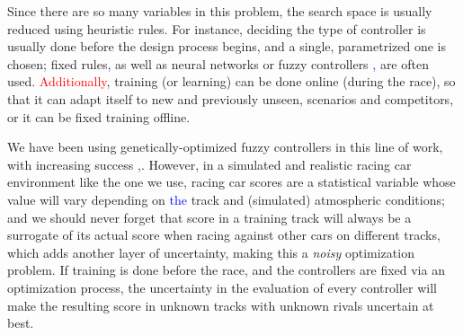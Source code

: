 \documentclass[10pt,journal,compsoc]{IEEEtran}
\begin{document}
Since there are so many variables in this problem, the search space is usually reduced using heuristic rules. For instance, deciding the type of controller is usually done before the design process begins, and a single, parametrized one
is chosen; fixed rules\textcolor{blue}{,} as well as neural networks \cite{KIM201287} or fuzzy controllers \cite{PerezEvolvingFuzzy09}\textcolor{blue}{,} are often used. \textcolor{red}{
Additionally}, training (or learning) \cite{Loiacono:2012:LEA:2212908.2212953} can be done online (during the
race), so that it can adapt itself to new and previously unseen,
scenarios and competitors, or it can be fixed training offline. 

We have been using genetically-optimized fuzzy controllers in this line of work, with increasing success \cite{salem_evo17},\cite{salem_evo18}.
However, in a simulated and realistic racing car environment like the one we use, racing car scores are a
    statistical variable whose value will vary depending on \textcolor{blue}{the} track and
    (simulated) atmospheric conditions; and we should never forget
    that score in a training track will always be a surrogate of its
    actual score when racing against other cars on different tracks,
    which adds another layer of uncertainty, making this a {\em noisy} optimization problem.
If training is done before the
    race, and the controllers are fixed via an optimization process,
    the uncertainty in the evaluation of every controller will make
    the resulting score in unknown tracks with unknown rivals
    uncertain at best.
\end{document}
